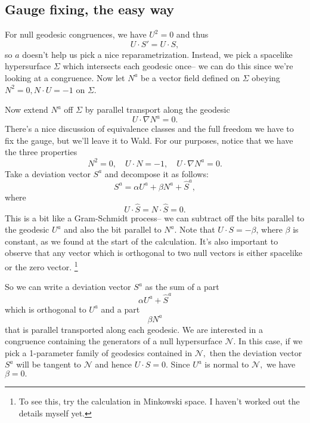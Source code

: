 \subsection*{Gauge fixing, the easy way}
For null geodesic congruences, we have $U^2=0$ and thus
\begin{equation*}
    U\cdot S'= U\cdot S,
\end{equation*}
so $a$ doesn't help us pick a nice reparametrization. Instead, we pick a spacelike hypersurface $\Sigma$ which intersects each geodesic once-- we can do this since we're looking at a congruence. Now let $N^a$ be a vector field defined on $\Sigma$ obeying $N^2=0, N\cdot U=-1$ on $\Sigma$.

Now extend $N^a$ off $\Sigma$ by parallel transport along the geodesic
\begin{equation}
    U\cdot \nabla N^a=0.
\end{equation}
There's a nice discussion of equivalence classes and the full freedom we have to fix the gauge, but we'll leave it to Wald. For our purposes, notice that we have the three properties
\begin{equation}
    N^2 = 0, \quad U\cdot N=-1,\quad U\cdot \nabla N^a=0.
\end{equation}
Take a deviation vector $S^a$ and decompose it as follows:
\begin{equation}
    S^a= \alpha U^a +\beta N^a + \hat S^a,
\end{equation}
where
\begin{equation}
    U\cdot \hat S = N\cdot \hat S=0.
\end{equation}
This is a bit like a Gram-Schmidt process-- we can subtract off the bits parallel to the geodesic $U^a$ and also the bit parallel to $N^a$.
Note that $U\cdot S=-\beta$, where $\beta$ is constant, as we found at the start of the calculation. It's also important to observe that any vector which is orthogonal to two null vectors is either spacelike or the zero vector.%
    \footnote{To see this, try the calculation in Minkowski space. I haven't worked out the details myself yet.}

So we can write a deviation vector $S^a$ as the sum of a part
\begin{equation*}
    \alpha U^a + \hat S^a
\end{equation*}
which is orthogonal to $U^a$ and a part
\begin{equation*}
    \beta N^a
\end{equation*}
that is parallel transported along each geodesic.
We are interested in a congruence containing the generators of a null hypersurface $\mathcal{N}$. In this case, if we pick a 1-parameter family of geodesics contained in $\mathcal{N},$ then the deviation vector $S^a$ will be tangent to $\mathcal{N}$ and hence $U\cdot S=0$. Since $U^a$ is normal to $\mathcal{N},$ we have $\beta=0.$

